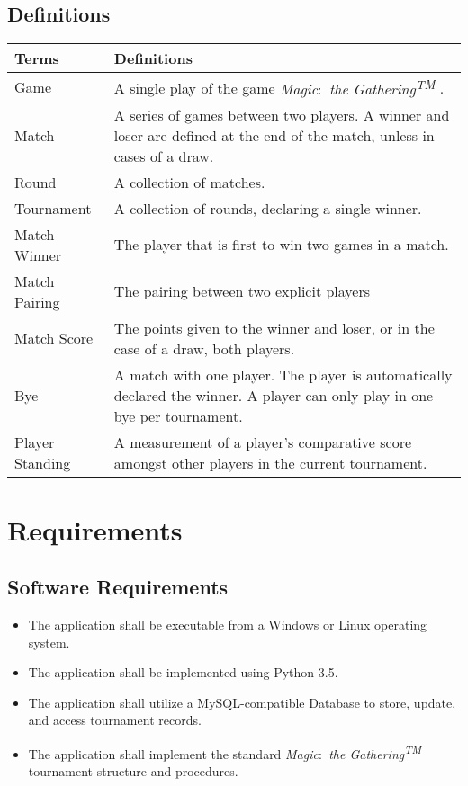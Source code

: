 \documentclass[11pt]{article}
\newcommand{\mtg}{\textit{Magic$\colon$ the Gathering\textsuperscript{TM}} }
\begin{document}
    
    \subsection{Definitions}
    
    \begin{center}
        \begin{tabular}{|m{4cm}|m{11cm}|}
            \hline
            \textbf{Terms} & \textbf{Definitions} \\
            \hline
            Game & A single play of the game \mtg.\\
            \hline
            Match & A series of games between two players. A winner and loser are defined at the end of the match, unless in cases of a draw.\\
            \hline
            Round & A collection of matches.\\
            \hline
            Tournament & A collection of rounds, declaring a single winner.\\
            \hline
            Match Winner & The player that is first to win two games in a match.\\
            \hline
            Match Pairing & The pairing between two explicit players\\
            \hline
            Match Score & The points given to the winner and loser, or in the case of a draw, both players.\\
            \hline
            Bye & A match with one player. The player is automatically declared the winner. A player can only play in one bye per tournament.\\
            \hline
            Player Standing & A measurement of a player's comparative score amongst other players in the current tournament.\\
            \hline
        \end{tabular}
        \label{table:1}
    \end{center}
    
    \section{Requirements}
    \subsection{Software Requirements}
    \begin{itemize}
        \item The application shall be executable from a Windows or Linux operating system.
        \item The application shall be implemented using Python 3.5.
        \item The application shall utilize a MySQL-compatible Database to store, update, and access tournament records.
        \item The application shall implement the standard \mtg tournament structure and procedures.
    \end{itemize}
    
\end{document}
